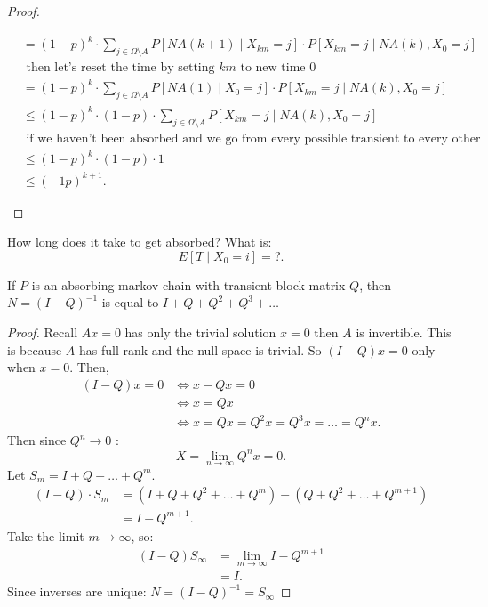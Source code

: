 \documentclass[a4paper]{article}
\begin{document}
\begin{theorem}
\begin{proof}
\begin{enumerate}
\begin{align*}
                                   &= (1-p)^{k} \cdot \sum_{j \in \Omega \setminus A} P[NA(k+1) \mid X_{km} = j] \cdot P[X_{km} = j \mid NA(k), X_0=j] \\ 
                                   &\text{ then let's reset the time by setting $km$ to new time  $0$}\\
                                   &= (1-p)^{k} \cdot \sum_{j \in \Omega \setminus A} P[NA(1) \mid X_{0} = j] \cdot P[X_{km} = j \mid NA(k), X_0=j] \\ 
                                   &\leq (1-p)^{k} \cdot (1-p) \cdot \sum_{j \in \Omega \setminus A} P[X_{km} = j \mid NA(k), X_0=j] \\ 
                                   &\text{ if we haven't been absorbed and we go from every possible transient to every other transient, the probabilities sum to 1!} \\
                                   &\leq (1-p)^{k} \cdot (1-p) \cdot 1 \\
                                   &\leq (-1p)^{k+1}
        .\end{align*}
    \end{enumerate}
  \end{proof}
\end{theorem}

\begin{remark}
  How long does it take to get absorbed? What is:
  \[
    E[T \mid X_0 =i] = ?
  .\] 
\end{remark}

\begin{prop}
  If $P$ is an absorbing markov chain with transient block matrix  $Q$, then  $N=(I-Q)^{-1}$ is equal to $I+Q+Q^{2}+Q^{3} + \ldots$ 

  \begin{proof}
    Recall $Ax = 0$ has only the trivial solution  $x=0$ then  $A$ is invertible. This is because  $A$ has full rank and the null space is trivial. So  $(I-Q)x =0$ only when  $x=0$. Then,
     \begin{align*}
       (I-Q)x = 0 &\iff x - Qx = 0\\
                  &\iff x = Qx \\
                  &\iff x = Qx = Q^{2}x = Q^{3}x = \ldots = Q^{n}x 
    .\end{align*}
    Then since $Q^{n} \to 0$ :
    \[
    X = \lim_{n \to \infty} Q^{n} x = 0
    .\] 
    Let $S_{m} = I + Q + \ldots + Q^{m}$.
    \begin{align*}
      (I-Q) \cdot S_m &= (I + Q + Q^{2} + \ldots + Q^{m}) - (Q + Q^{2} + \ldots + Q^{m+1}) \\
                      &= I - Q^{m+1}  
    .\end{align*}
    Take the limit $m \to \infty$, so:
     \begin{align*}
       (I-Q) S_\infty &= \lim_{m \to \infty} I - Q^{m+1} \\
       &= I  
    .\end{align*}
    Since inverses are unique:
    $N = (I-Q)^{-1} = S_\infty$
  \end{proof}
\end{prop}
\end{document}
